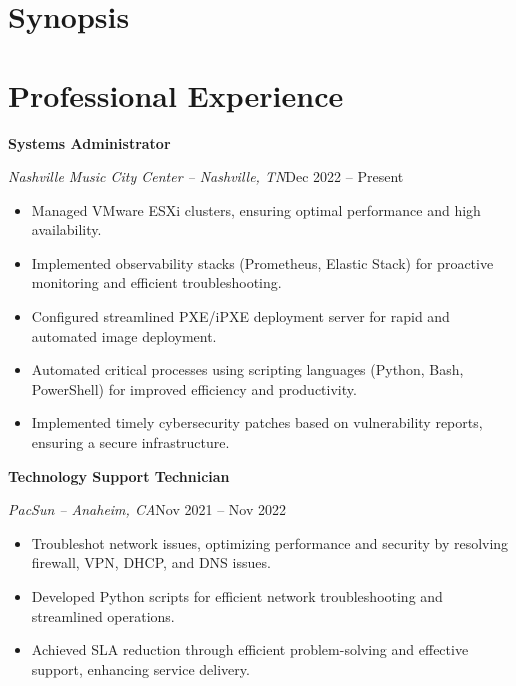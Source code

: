 \documentclass[a4paper]{article}
\begin{document}
\begin{minipage}[t]{0.62\textwidth}
    \raggedright
    \vspace*{0pt}

    \section{Synopsis}
    \appsynopsis{}

    \section{Professional Experience}
    \textbf{Systems Administrator}\par
    \textit{Nashville Music City Center -- Nashville, TN}\hfill Dec 2022 -- Present
    \begin{itemize}[noitemsep,nolistsep]
        \item Managed VMware ESXi clusters, ensuring optimal performance and high availability.
        \item Implemented observability stacks (Prometheus, Elastic Stack) for proactive monitoring and efficient troubleshooting.
        \item Configured streamlined PXE/iPXE deployment server for rapid and automated image deployment.
        \item Automated critical processes using scripting languages (Python, Bash, PowerShell) for improved efficiency and productivity.
        \item Implemented timely cybersecurity patches based on vulnerability reports, ensuring a secure infrastructure.
    \end{itemize}

    \vspace{0.5em}
    \textbf{Technology Support Technician}\par
    \textit{PacSun -- Anaheim, CA}\hfill Nov 2021 -- Nov 2022
    \begin{itemize}[noitemsep,nolistsep]
        \item Troubleshot network issues, optimizing performance and security by resolving firewall, VPN, DHCP, and DNS issues.
        \item Developed Python scripts for efficient network troubleshooting and streamlined operations.
        \item Achieved SLA reduction through efficient problem-solving and effective support, enhancing service delivery.
    \end{itemize}


\end{minipage}
\end{document}
